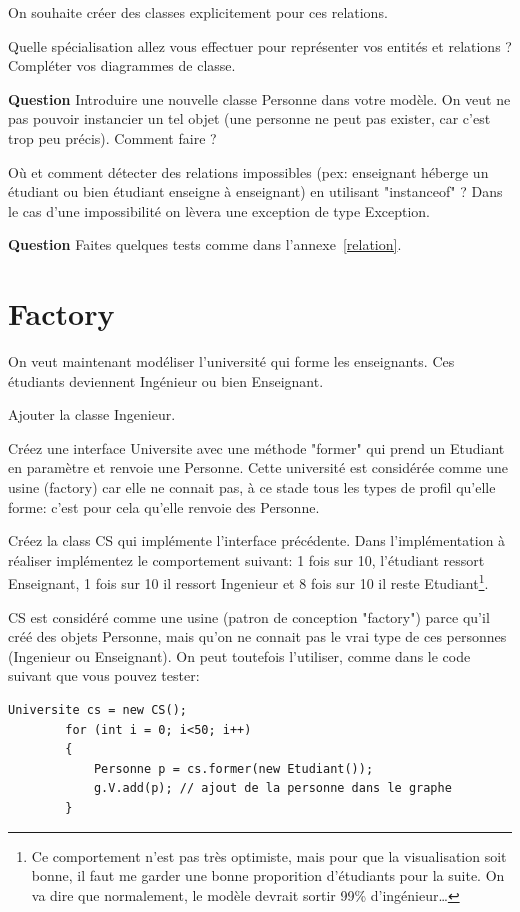 \documentclass[11pt,TP,2A]{tdtp}
\newcounter{numeroexoq}
\newcommand{\question}{\par\noindent\stepcounter{numeroexoq}
\hspace{-.25cm}\colorbox{normal}{\textbf{Question \arabic{numeroexoq}}}\quad}
\begin{document}
On souhaite créer des classes explicitement pour ces relations.

\quest Quelle spécialisation allez vous effectuer pour représenter vos entités et relations ? Compléter vos diagrammes de classe.

\question Introduire une nouvelle classe Personne dans votre modèle. On veut ne pas pouvoir instancier un tel objet (une personne ne peut pas exister, car c'est trop peu précis). Comment faire ?

\quest Où et comment détecter des relations impossibles (pex: enseignant héberge un étudiant ou bien étudiant enseigne à enseignant) en utilisant "instanceof" ? Dans le cas d'une impossibilité on lèvera une exception de type Exception. 

\question Faites quelques tests comme dans l'annexe~\ref{relation}.

\section{Factory}

On veut maintenant modéliser l'université qui forme les enseignants. Ces étudiants deviennent Ingénieur ou bien Enseignant.

\quest Ajouter la classe Ingenieur.

\quest Créez une interface Universite avec une méthode "former" qui prend un Etudiant en paramètre et renvoie une Personne. Cette université est considérée comme une usine (factory) car elle ne connait pas, à ce stade tous les types de profil qu'elle forme: c'est pour cela qu'elle renvoie des Personne.

\quest Créez la class CS qui implémente l'interface précédente. Dans l'implémentation à réaliser implémentez le comportement suivant: 1 fois sur 10, l'étudiant ressort Enseignant, 1  fois sur 10 il ressort Ingenieur et 8 fois sur 10 il reste Etudiant\footnote{Ce comportement n'est pas très optimiste, mais pour que la visualisation soit bonne, il faut me garder une bonne proporition d'étudiants pour la suite. On va dire que normalement, le modèle devrait sortir 99\% d'ingénieur\ldots}.

CS est considéré comme une usine (patron de conception "factory") parce qu'il créé des objets Personne, mais qu'on ne connait pas le vrai type de ces personnes (Ingenieur ou Enseignant). On peut toutefois l'utiliser, comme dans le code suivant que vous pouvez tester:

\begin{lstlisting}[style=java]
        Universite cs = new CS();
        for (int i = 0; i<50; i++)
        {
            Personne p = cs.former(new Etudiant());
            g.V.add(p); // ajout de la personne dans le graphe
        }
\end{lstlisting}
\end{document}
